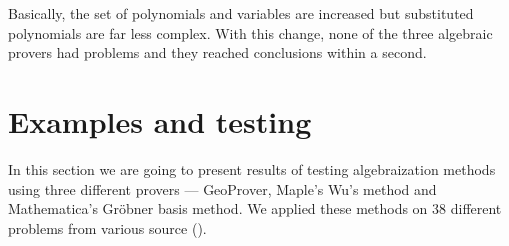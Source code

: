 \documentclass[final,1p,times,authoryear]{elsarticle}
\begin{document}
Basically, the set of polynomials and variables are increased but
substituted polynomials are far less complex. With this change, none
of the three algebraic provers had problems and they reached
conclusions within a second.

\section{Examples and testing}

In this section we are going to present results of testing
algebraization methods using three different provers --- GeoProver,
Maple's Wu's method and Mathematica's Gr\"obner basis method. We
applied these methods on 38 different problems from various source
(\cite{janicic1997zbirka, shao2016challenging, arhzbirka, kinknjiga}).
\end{document}

